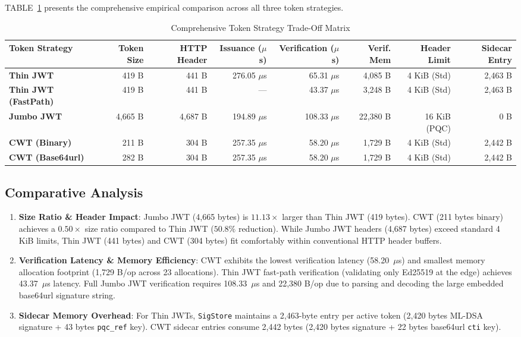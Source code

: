 \documentclass{article}
\begin{document}
\begin{IEEEkeywords}
TABLE~\ref{tab:token_strategy_comparison} presents the comprehensive empirical comparison across all three token strategies.

\begin{table}[htbp]
\caption{Comprehensive Token Strategy Trade-Off Matrix}
\label{tab:token_strategy_comparison}
\centering
\begin{tabular}{lrrrrrrr}
\toprule
\textbf{Token Strategy} & \textbf{Token Size} & \textbf{HTTP Header} & \textbf{Issuance ($\mu$s)} & \textbf{Verification ($\mu$s)} & \textbf{Verif. Mem} & \textbf{Header Limit} & \textbf{Sidecar Entry} \\
\midrule
\textbf{Thin JWT} & 419 B & 441 B & 276.05 $\mu$s & 65.31 $\mu$s & 4,085 B & 4 KiB (Std) & 2,463 B \\
\textbf{Thin JWT (FastPath)} & 419 B & 441 B & --- & 43.37 $\mu$s & 3,248 B & 4 KiB (Std) & 2,463 B \\
\textbf{Jumbo JWT} & 4,665 B & 4,687 B & 194.89 $\mu$s & 108.33 $\mu$s & 22,380 B & 16 KiB (PQC) & 0 B \\
\textbf{CWT (Binary)} & 211 B & 304 B & 257.35 $\mu$s & 58.20 $\mu$s & 1,729 B & 4 KiB (Std) & 2,442 B \\
\textbf{CWT (Base64url)} & 282 B & 304 B & 257.35 $\mu$s & 58.20 $\mu$s & 1,729 B & 4 KiB (Std) & 2,442 B \\
\bottomrule
\end{tabular}
\end{table}

\subsection{Comparative Analysis}
\begin{enumerate}
    \item \textbf{Size Ratio \& Header Impact}: Jumbo JWT (4,665 bytes) is $11.13\times$ larger than Thin JWT (419 bytes). CWT (211 bytes binary) achieves a $0.50\times$ size ratio compared to Thin JWT ($50.8\%$ reduction). While Jumbo JWT headers (4,687 bytes) exceed standard 4 KiB limits, Thin JWT (441 bytes) and CWT (304 bytes) fit comfortably within conventional HTTP header buffers.
    \item \textbf{Verification Latency \& Memory Efficiency}: CWT exhibits the lowest verification latency (58.20~$\mu$s) and smallest memory allocation footprint (1,729 B/op across 23 allocations). Thin JWT fast-path verification (validating only Ed25519 at the edge) achieves 43.37~$\mu$s latency. Full Jumbo JWT verification requires 108.33~$\mu$s and 22,380 B/op due to parsing and decoding the large embedded base64url signature string.
    \item \textbf{Sidecar Memory Overhead}: For Thin JWTs, \texttt{SigStore} maintains a 2,463-byte entry per active token (2,420 bytes ML-DSA signature + 43 bytes \texttt{pqc\_ref} key). CWT sidecar entries consume 2,442 bytes (2,420 bytes signature + 22 bytes base64url \texttt{cti} key).
\end{enumerate}


\end{IEEEkeywords}
\end{document}
